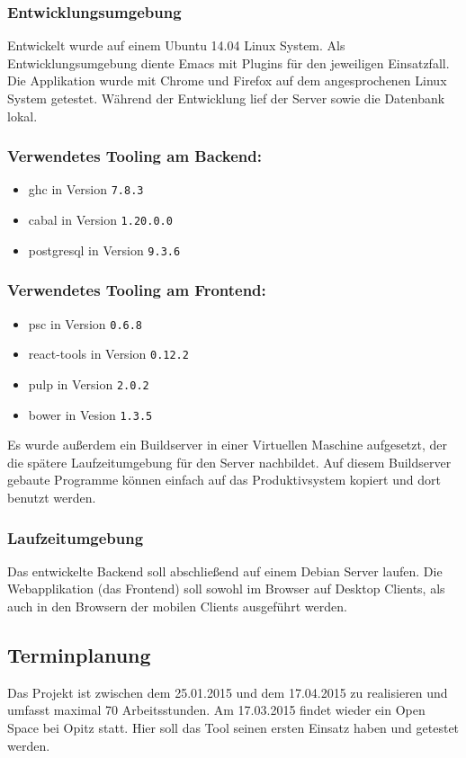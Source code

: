 \subsubsection{Entwicklungsumgebung}
Entwickelt wurde auf einem Ubuntu 14.04 Linux System. Als
Entwicklungsumgebung diente Emacs mit Plugins für den jeweiligen
Einsatzfall. Die Applikation wurde mit Chrome und Firefox auf dem
angesprochenen Linux System getestet. Während der Entwicklung lief der
Server sowie die Datenbank lokal.
\subsubsection*{Verwendetes Tooling am Backend:}
\begin{itemize}
\item \gls{ghc} in Version \texttt{7.8.3}
\item \gls{cabal} in Version \texttt{1.20.0.0}
\item \gls{postgresql} in Version \texttt{9.3.6}
\end{itemize}

\subsubsection*{Verwendetes Tooling am Frontend:}
\begin{itemize}
\item \gls{psc} in Version \texttt{0.6.8}
\item \gls{react-tools} in Version \texttt{0.12.2}
\item \gls{pulp} in Version \texttt{2.0.2}
\item \gls{bower} in Vesion \texttt{1.3.5}
\end{itemize}
Es wurde außerdem ein Buildserver in einer Virtuellen Maschine
aufgesetzt, der die spätere Laufzeitumgebung für den Server
nachbildet. Auf diesem Buildserver gebaute Programme können einfach
auf das Produktivsystem kopiert und dort benutzt werden.
\subsubsection{Laufzeitumgebung}
Das entwickelte Backend soll abschließend auf einem Debian Server
laufen. Die Webapplikation (das Frontend) soll sowohl im Browser auf
Desktop Clients, als auch in den Browsern der mobilen Clients
ausgeführt werden.
\subsection{Terminplanung}
Das Projekt ist zwischen dem 25.01.2015 und dem 17.04.2015 zu
realisieren und umfasst maximal 70 Arbeitsstunden. Am 17.03.2015
findet wieder ein Open Space bei Opitz statt. Hier soll das Tool
seinen ersten Einsatz haben und getestet werden.

